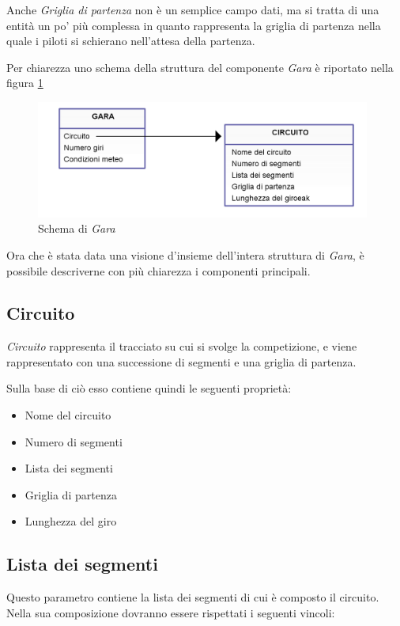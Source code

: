 \documentclass[a4paper,11pt, twoside, openright]{book}
\begin{document}
      Anche \textsl{Griglia di partenza} non è un semplice campo dati, ma si tratta di una entità un po' più complessa
      in quanto rappresenta la griglia di partenza nella quale i piloti si schierano nell'attesa della partenza.
      
      Per chiarezza uno schema della struttura del componente \textsl{Gara} è riportato nella figura \ref{Fig:SchemaGara}
      
      \begin{figure}[ht]
	\centering
	\includegraphics[width=110mm]{./Immagini/SchemaGara.png}
	\caption{Schema di \textsl{Gara}}
	\label{Fig:SchemaGara}
      \end{figure}
      
      Ora che è stata data una visione d'insieme dell'intera struttura di \textsl{Gara}, è possibile descriverne con più
      chiarezza i componenti principali.
	
      \subsection{Circuito}
	\textsl{Circuito} rappresenta il tracciato su cui si svolge la competizione, e viene rappresentato con una successione
	di segmenti e una griglia di partenza.
	
	Sulla base di ciò esso contiene quindi le seguenti proprietà:
	
	\begin{itemize}
	  \item Nome del circuito
	  \item Numero di segmenti
	  \item Lista dei segmenti
	  \item Griglia di partenza
	  \item Lunghezza del giro
	\end{itemize}
	  
	\subsection{Lista dei segmenti}
	  Questo parametro contiene la lista dei segmenti di cui è composto il circuito. Nella sua composizione
	  dovranno essere rispettati i seguenti vincoli:
	  
\end{document}
